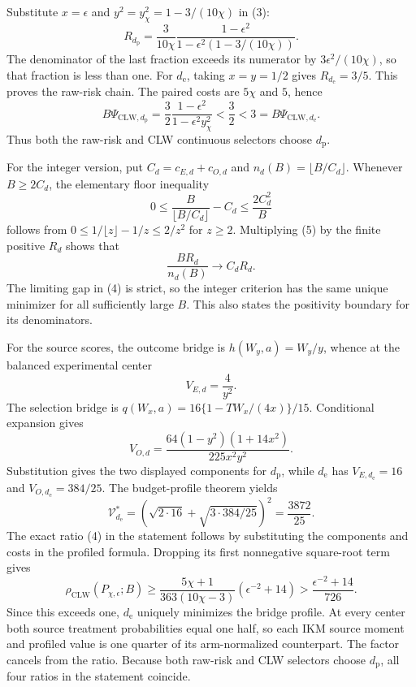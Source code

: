 Substitute \(x=\epsilon\) and \(y^2=y_\chi^2=1-3/(10\chi)\) in (3):
\[
 R_{d_{\mathrm p}}
 =\frac{3}{10\chi}\frac{1-\epsilon^2}
 {1-\epsilon^2(1-3/(10\chi))}.
\]
The denominator of the last fraction exceeds its numerator by \(3\epsilon^2/(10\chi)\), so that fraction is less than one. For \(d_{\mathrm e}\), taking \(x=y=1/2\) gives \(R_{d_{\mathrm e}}=3/5\). This proves the raw-risk chain. The paired costs are \(5\chi\) and \(5\), hence
\[
 B\Psi_{\mathrm{CLW},d_{\mathrm p}}
 =\frac32\frac{1-\epsilon^2}{1-\epsilon^2y_\chi^2}
 <\frac32<3
 =B\Psi_{\mathrm{CLW},d_{\mathrm e}}.                    \tag{4}
\]
Thus both the raw-risk and CLW continuous selectors choose \(d_{\mathrm p}\).

For the integer version, put \(C_d=c_{E,d}+c_{O,d}\) and \(n_d(B)=\lfloor B/C_d\rfloor\). Whenever \(B\ge2C_d\), the elementary floor inequality
\[
 0\le \frac{B}{\lfloor B/C_d\rfloor}-C_d
 \le\frac{2C_d^2}{B}                                      \tag{5}
\]
follows from \(0\le1/\lfloor z\rfloor-1/z\le2/z^2\) for \(z\ge2\). Multiplying (5) by the finite positive \(R_d\) shows that
\[
 \frac{B R_d}{n_d(B)}\longrightarrow C_dR_d.
\]
The limiting gap in (4) is strict, so the integer criterion has the same unique minimizer for all sufficiently large \(B\). This also states the positivity boundary for its denominators.

For the source scores, the outcome bridge is \(h(W_y,a)=W_y/y\), whence at the balanced experimental center
\[
 V_{E,d}=\frac4{y^2}.
\]
The selection bridge is \(q(W_x,a)=16\{1-TW_x/(4x)\}/15\). Conditional expansion gives
\[
 V_{O,d}=\frac{64(1-y^2)(1+14x^2)}{225x^2y^2}.
\]
Substitution gives the two displayed components for \(d_{\mathrm p}\), while \(d_{\mathrm e}\) has \(V_{E,d_{\mathrm e}}=16\) and \(V_{O,d_{\mathrm e}}=384/25\). The budget-profile theorem yields
\[
 \mathcal V_{d_{\mathrm e}}^*=\left(\sqrt{2\cdot16}+\sqrt{3\cdot384/25}\right)^2
 =\frac{3872}{25}.
\]
The exact ratio (4) in the statement follows by substituting the components and costs in the profiled formula. Dropping its first nonnegative square-root term gives
\[
 \rho_{\mathrm{CLW}}(P_{\chi,\epsilon};B)
 \ge\frac{5\chi+1}{363(10\chi-3)}(\epsilon^{-2}+14)
 >\frac{\epsilon^{-2}+14}{726}.                            \tag{6}
\]
Since this exceeds one, \(d_{\mathrm e}\) uniquely minimizes the bridge profile. At every center both source treatment probabilities equal one half, so each IKM source moment and profiled value is one quarter of its arm-normalized counterpart. The factor cancels from the ratio. Because both raw-risk and CLW selectors choose \(d_{\mathrm p}\), all four ratios in the statement coincide.

